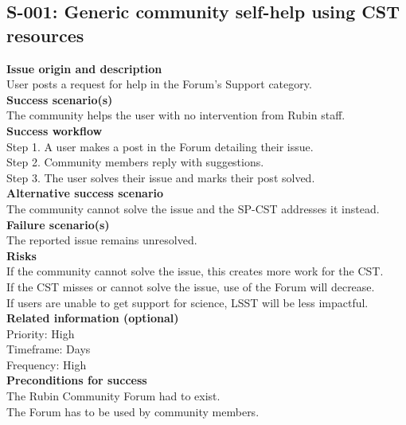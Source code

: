 \subsection{S-001: Generic community self-help using CST resources}

{\bf Issue origin and description} \\
User posts a request for help in the Forum's Support category. \\

{\bf Success scenario(s)} \\
The community helps the user with no intervention from Rubin staff. \\

{\bf Success workflow} \\
Step 1. A user makes a post in the Forum detailing their issue.\\
Step 2. Community members reply with suggestions.\\
Step 3. The user solves their issue and marks their post solved.\\

{\bf Alternative success scenario} \\
The community cannot solve the issue and the SP-CST addresses it instead. \\

{\bf Failure scenario(s)} \\
The reported issue remains unresolved. \\

{\bf Risks}\\
If the community cannot solve the issue, this creates more work for the CST. \\
If the CST misses or cannot solve the issue, use of the Forum will decrease. \\
If users are unable to get support for science, LSST will be less impactful. \\

{\bf Related information (optional)} \\
Priority: High \\
Timeframe: Days \\
Frequency: High \\

{\bf Preconditions for success}\\
The Rubin Community Forum had to exist. \\
The Forum has to be used by community members. \\
